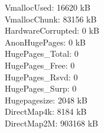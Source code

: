 \documentclass[12pt]{article}
\begin{document}
{{{{VmallocUsed:       16620 kB\\
VmallocChunk:      83156 kB\\
HardwareCorrupted:     0 kB\\
AnonHugePages:         0 kB\\
HugePages\_Total:       0\\
HugePages\_Free:        0\\
HugePages\_Rsvd:        0\\
HugePages\_Surp:        0\\
Hugepagesize:       2048 kB\\
DirectMap4k:        8184 kB\\
DirectMap2M:      903168 kB\\
}
} \vspace*{0.5cm} } } 
\end{document}
